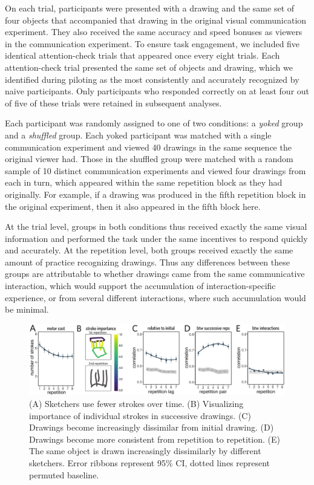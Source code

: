 \documentclass[10pt,letterpaper]{article}
\begin{document}
On each trial, participants were presented with a drawing and the same set of four objects that accompanied that drawing in the original visual communication experiment.
They also received the same accuracy and speed bonuses as viewers in the communication experiment.
To ensure task engagement, we included five identical attention-check trials that appeared once every eight trials.
Each attention-check trial presented the same set of objects and drawing, which we identified during piloting as the most consistently and accurately recognized by naive participants.
Only participants who responded correctly on at least four out of five of these trials were retained in subsequent analyses.

Each participant was randomly assigned to one of two conditions: a \textit{yoked} group and a \textit{shuffled} group.
Each yoked participant was matched with a single communication experiment and viewed 40 drawings in the same sequence the original viewer had.
Those in the shuffled group were matched with a random sample of 10 distinct communication experiments and viewed four drawings from each in turn, which appeared within the same repetition block as they had originally.
For example, if a drawing was produced in the fifth repetition block in the original experiment, then it also appeared in the fifth block here.

At the trial level, groups in both conditions thus received exactly the same visual information and performed the task under the same incentives to respond quickly and accurately.
At the repetition level, both groups received exactly the same amount of practice recognizing drawings.
Thus any differences between these groups are attributable to whether drawings came from the same communicative interaction, which would support the accumulation of interaction-specific experience, or from several different interactions, where such accumulation would be minimal.

\begin{figure}
\includegraphics[width=0.94\linewidth]{figures/drawing_changes.pdf}
\caption{(A) Sketchers use fewer strokes over time. (B) Visualizing importance of individual strokes in successive drawings. (C) Drawings become increasingly dissimilar from initial drawing. (D) Drawings become more consistent from repetition to repetition. %
(E) The same object is drawn increasingly dissimilarly by different sketchers. %
Error ribbons represent 95\% CI, dotted lines represent permuted baseline.}
\label{within-across}
\end{figure}
\end{document}
